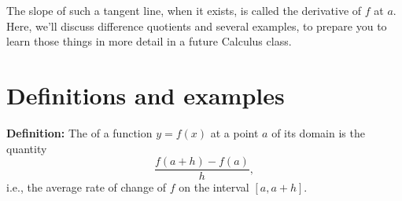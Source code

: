 \documentclass{ximera}
\begin{document}


The slope of such a tangent line, when it exists, is called the derivative of $f$ at $a$. Here, we'll discuss difference quotients and several examples, to prepare you to learn those things in more detail in a future Calculus class.


\section{Definitions and examples}

\begin{callout}
  {\bf Definition:} The  of a function $y=f(x)$ at a point $a$ of its domain is the quantity $$\frac{f(a+h)-f(a)}{h},$$i.e., the average rate of change of $f$ on the interval $[a,a+h]$.
\end{callout}
\end{document}
